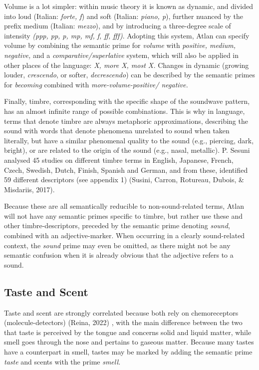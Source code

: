 Volume is a lot simpler: within music theory it is known as dynamic, and divided into loud (Italian: \textit{forte, f}) and soft (Italian: \textit{piano, p}), further nuanced by the prefix medium (Italian: \textit{mezzo}), and by introducing a three-degree scale of intensity \textit{(ppp, pp, p, mp, mf, f, ff, fff)}. Adopting this system, Atlan can specify volume by combining the semantic prime for \textit{volume} with \textit{positive, medium, negative,} and a \textit{comparative/superlative} system, which will also be applied in other places of the language: \textit{X, more X, most X.} Changes in dynamic (growing louder, \textit{crescendo}, or softer, \textit{decrescendo}) can be described by the semantic primes for \textit{becoming} combined with \textit{more-volume-positive/ negative.} 

Finally, timbre, corresponding with the specific shape of the soundwave pattern, has an almost infinite range of possible combinations. This is why in language, terms that denote timbre are always metaphoric approximations, describing the sound with words that denote phenomena unrelated to sound when taken literally, but have a similar phenomenal quality to the sound (e.g., piercing, dark, bright), or are related to the origin of the sound (e.g., nasal, metallic). P. Sesuni analysed 45 studies on different timbre terms in English, Japanese, French, Czech, Swedish, Dutch, Finish, Spanish and German, and from these, identified 59 different descriptors (see appendix 1) (Susini, Carron, Rotureau, Dubois, \& Misdariis, 2017). 

Because these are all semantically reducible to non-sound-related terms, Atlan will not have any semantic primes specific to timbre, but rather use these and other timbre-descriptors, preceded by the semantic prime denoting \textit{sound}, combined with an adjective-marker. When occurring in a clearly sound-related context, the \textit{sound} prime may even be omitted, as there might not be any semantic confusion when it is already obvious that the adjective refers to a sound. 


\subsection{Taste and Scent}

\noindent Taste and scent are strongly correlated because both rely on chemoreceptors (molecule-detectors) (Reina, 2022) , with the main difference between the two that taste is perceived by the tongue and concerns solid and liquid matter, while smell goes through the nose and pertains to gaseous matter. Because many tastes have a counterpart in smell, tastes may be marked by adding the semantic prime \textit{taste} and scents with the prime \textit{smell.} 

